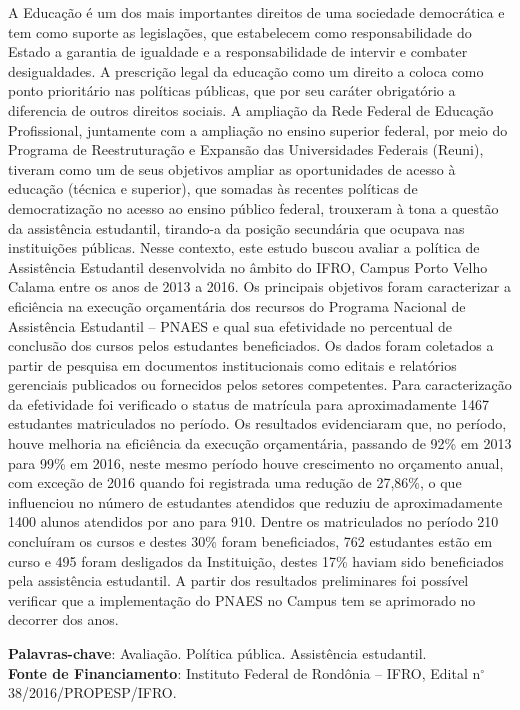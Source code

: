 \documentclass[article,12pt,onesidea,4paper,english,brazil]{abntex2}
\begin{document}
	\noindent A Educação é um dos mais importantes direitos de uma sociedade democrática e tem como suporte as legislações, que estabelecem como responsabilidade do Estado a garantia de igualdade e a responsabilidade de intervir e combater desigualdades. A prescrição legal da educação como um direito a coloca como ponto prioritário nas políticas públicas, que por seu caráter obrigatório a diferencia de outros direitos sociais. A ampliação da Rede Federal de Educação Profissional, juntamente com a ampliação no ensino superior federal, por meio do Programa de Reestruturação e Expansão das Universidades Federais (Reuni), tiveram como um de seus objetivos ampliar as oportunidades de acesso à educação (técnica e superior), que somadas às recentes políticas de democratização no acesso ao ensino público federal, trouxeram à tona a questão da assistência estudantil, tirando-a da posição secundária que ocupava nas instituições públicas. Nesse contexto, este estudo buscou avaliar a política de Assistência Estudantil desenvolvida no âmbito do IFRO, Campus Porto Velho Calama entre os anos de 2013 a 2016. Os principais objetivos foram caracterizar a eficiência na execução orçamentária dos recursos do Programa Nacional de Assistência Estudantil – PNAES e qual sua efetividade no percentual de conclusão dos cursos pelos estudantes beneficiados. Os dados foram coletados a partir de pesquisa em documentos institucionais como editais e relatórios gerenciais publicados ou fornecidos pelos setores competentes. Para caracterização da efetividade foi verificado o status de matrícula para aproximadamente 1467 estudantes matriculados no período. Os resultados evidenciaram que, no período, houve melhoria na eficiência da execução orçamentária, passando de 92\% em 2013 para 99\% em 2016, neste mesmo período houve crescimento no orçamento anual, com exceção de 2016 quando foi registrada uma redução de 27,86\%, o que influenciou no número de estudantes atendidos que reduziu de aproximadamente 1400 alunos atendidos por ano para 910. Dentre os matriculados no período 210 concluíram os cursos e destes 30\% foram beneficiados, 762 estudantes estão em curso e 495 foram desligados da Instituição, destes 17\% haviam sido beneficiados pela assistência estudantil. A partir dos resultados preliminares foi possível verificar que a implementação do PNAES no Campus tem se aprimorado no decorrer dos anos.
	
	\vspace{\onelineskip}
	
	\noindent
	\textbf{Palavras-chave}: Avaliação. Política pública. Assistência estudantil. \\
	\textbf{Fonte de Financiamento}: Instituto Federal de Rondônia – IFRO, Edital n$^\circ$ 38/2016/PROPESP/IFRO.
	
\end{document}
